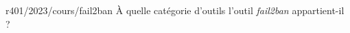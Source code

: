 \begin{question}{r401/2023/cours/fail2ban}
  À quelle catégorie d'outils l'outil {\em fail2ban} appartient-il ?
  \begin{reponseshoriz}
  \end{reponseshoriz}
\end{question}
